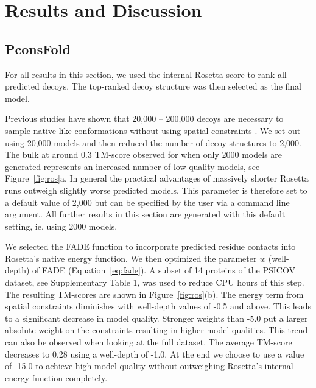 \documentclass{bioinfo}
\begin{document}
\section{Results and Discussion}

\subsection{PconsFold}


For all results in this section, we used the internal Rosetta score to
rank all predicted decoys. The top-ranked decoy structure was then
selected as the  final model.

Previous studies have shown that 20,000 -- 200,000 decoys are
necessary to sample native-like conformations without using spatial
constraints \cite[]{Simons10526365}. We set out using 20,000 models
and then reduced the number of decoy structures to 2,000. The bulk at
around 0.3 TM-score observed for when only 2000 models are generated
represents an increased number of low quality models, see
Figure~\ref{fig:ros}a. In general the practical advantages of
massively shorter Rosetta runs outweigh slightly worse predicted
models. This parameter is therefore set to a default value of 2,000
but can be specified by the user via a command line argument. All
further results in this section are generated with this default
setting, ie. using 2000 models. 


We selected the FADE function to incorporate predicted residue
contacts into Rosetta's native energy function. We then optimized the
parameter $w$ (well-depth) of FADE (Equation~\ref{eq:fade}).
{\color{red}A subset of 14 proteins of the PSICOV dataset, see
Supplementary Table 1, was used to reduce CPU hours of this step.} The
resulting TM-scores are shown in Figure~\ref{fig:ros}(b). The energy
term from spatial constraints diminishes with well-depth values of
-0.5 and above. This leads to a significant decrease in model quality.
Stronger weights than -5.0  put a larger absolute weight on the
constraints resulting in higher model qualities. {\color{red} This
trend can also be observed when looking at the full dataset. The
average TM-score decreases to 0.28 using a well-depth of -1.0.} At the
end we choose to use a value of -15.0 to achieve high model quality
without outweighing Rosetta's internal energy function completely.
\end{document}
